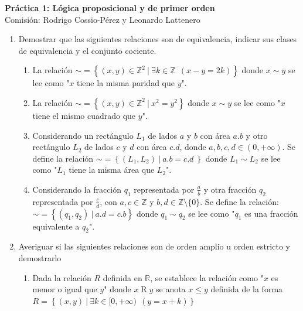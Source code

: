 \documentclass[a4paper]{article}
\newcommand{\exercise}{\item}
\begin{document}
\noindent \hrulefill 
\vspace{-7pt}
\begin{center} 
	\textbf{ Práctica 1: Lógica proposicional y de primer orden } \\
	Comisión: Rodrigo Cossio-Pérez y Leonardo Lattenero
\end{center}
\vspace{-10pt}
\hrulefill
\begin{enumerate}
	\exercise Demostrar que las siguientes relaciones son de equivalencia, indicar sus clases de equivalencia y el conjunto cociente.
	\begin{enumerate} [label=(\alph*)]
		\item La relación $ \sim = \left\lbrace (x,y) \in \mathbb{Z}^{2} ~|~ \exists k \in \mathbb{Z} ~~(x-y=2k) \right\rbrace$ donde $x \sim y$ se lee como "$x$ tiene la misma paridad que $y$".
		\item La relación $ \sim = \left\lbrace (x,y)\in \mathbb{Z}^{2} ~|~ x^{2}=y^{2} \right\rbrace$ donde $x \sim y$ se lee como "$x$ tiene el mismo cuadrado que $y$".
		\item Considerando un rectángulo $L_{1}$ de lados $a$ y $b$ con área $a.b$ y otro rectángulo $L_2$ de lados $c$ y $d$ con área $c.d$, donde $a,b,c,d \in ( 0 , +\infty)$. Se define la relación $ \sim = \left\lbrace (L_1,L_2) ~|~ a.b=c.d ~\right\rbrace$ donde $L_{1}\sim L_{2}$ se lee como "$L_{1}$ tiene la misma área que $L_{2}$".
		\item Considerando la fracción $q_1$ representada por $\displaystyle\frac{a}{b}$ y otra fracción $q_2$ representada por $\displaystyle\frac{c}{d}$, con $a,c\in\mathbb{Z}$ y $b,d\in\mathbb{Z}\setminus\{0\} $. Se define la relación: $\sim = \left\lbrace (q_1,q_2) ~|~ a.d=c.b \right\rbrace$ donde $q_{1}\sim q_{2}$ se lee como "$q_{1}$ es una fracción equivalente a $q_{2}$".
	\end{enumerate}
	\exercise Averiguar si las siguientes relaciones son de orden amplio u orden estricto y demostrarlo
	\begin{enumerate} [label=(\alph*)]
		\item Dada la relación $R$ definida en $\mathbb{R}$, se establece la relación como "$x$ es menor o igual que $y$" donde $x\mathrel{R}y$ se anota $x\leq y$ definida de la forma $R = \left\lbrace (x,y) ~|~ \exists k \in [0,+\infty) ~~( y=x+k ) \right\rbrace$

\end{enumerate}
\end{enumerate}
\end{document}
